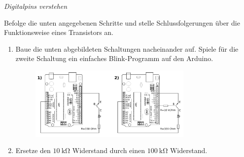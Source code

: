 \medskip

\begin{aufgabe} \emph{Digitalpins verstehen}
	
	Befolge die unten angegebenen Schritte und stelle Schlussfolgerungen über die Funktionsweise eines Transistors an.
	\begin{enumerate}[label=\alph*), itemsep=0mm,parsep=0mm]
		\item Baue die unten abgebildeten Schaltungen nacheinander auf. Spiele für die zweite Schaltung ein einfaches Blink-Programm auf den Arduino.
		\begin{figure}[H]
			\centering
			\includegraphics[width=0.75\textwidth]{./Zeichnungen/Schaltplan-Transistor-verstehen.png}
		\end{figure}
		\item Ersetze den $\SI{10}{\kilo\ohm}$ Widerstand durch einen $\SI{100}{\kilo\ohm}$ Widerstand.
	\end{enumerate}
\end{aufgabe}

